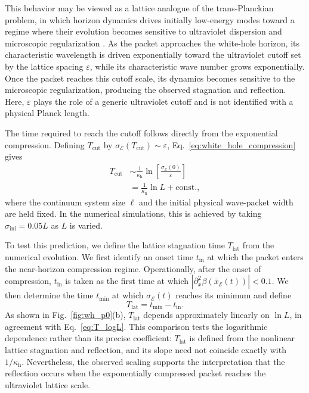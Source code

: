 \documentclass[reprint,amsmath,amssymb,aps,prb,showkeys,superscriptaddress]{revtex4-2}
\begin{document}
This behavior may be viewed as a lattice analogue of the
trans-Planckian problem, in which horizon dynamics drives initially
low-energy modes toward a regime where their evolution becomes
sensitive to ultraviolet dispersion and microscopic regularization
\cite{Jacobson1991,Jacobson1993,Unruh1995,
Corley1996,Akhmedov2024}. As the packet approaches the white-hole
horizon, its characteristic wavelength is driven exponentially
toward the ultraviolet cutoff set by the lattice spacing
$\varepsilon$, while its characteristic wave number grows
exponentially. Once the packet reaches this cutoff scale, its
dynamics becomes sensitive to the microscopic regularization,
producing the observed stagnation and reflection. Here,
$\varepsilon$ plays the role of a generic ultraviolet cutoff and is
not identified with a physical Planck length.

The time required to reach the cutoff follows directly from the
exponential compression. Defining $T_{\mathrm{cut}}$ by
$\sigma_{\mathcal E}(T_{\mathrm{cut}})\sim\varepsilon$,
Eq.~\eqref{eq:white_hole_compression} gives
\begin{align}
  T_{\mathrm{cut}}
  &\sim
  \frac{1}{\kappa_{\mathrm h}}
  \ln\left[
    \frac{\sigma_{\mathcal E}(0)}{\varepsilon}
  \right]
  \nonumber\\
  &=
  \frac{1}{\kappa_{\mathrm h}}\ln L
  +\mathrm{const.},
  \label{eq:T_logL}
\end{align}
where the continuum system size $\ell$ and the initial physical
wave-packet width are held fixed. In the numerical simulations,
this is achieved by taking
$\sigma_{\mathrm{ini}}=0.05L$ as $L$ is varied.

To test this prediction, we define the lattice stagnation time
$T_{\mathrm{lat}}$ from the numerical evolution. We first identify
an onset time $t_{\mathrm{in}}$ at which the packet enters the
near-horizon compression regime. Operationally, after the onset of
compression, $t_{\mathrm{in}}$ is taken as the first time at which
$|\partial_x^2\beta(\bar{x}_{\mathcal E}(t))|<0.1$. We then
determine the time $t_{\mathrm{min}}$ at which
$\sigma_{\mathcal E}(t)$ reaches its minimum and define
\begin{equation}
  T_{\mathrm{lat}}
  =
  t_{\mathrm{min}}-t_{\mathrm{in}}.
  \label{eq:lattice_stagnation_time}
\end{equation}
As shown in Fig.~\ref{fig:wh_p0}(b),
$T_{\mathrm{lat}}$ depends approximately linearly on $\ln L$, in
agreement with Eq.~\eqref{eq:T_logL}. This comparison tests the
logarithmic dependence rather than its precise coefficient:
$T_{\mathrm{lat}}$ is defined from the nonlinear lattice
stagnation and reflection, and its slope need not coincide exactly
with $1/\kappa_{\mathrm h}$. Nevertheless, the observed scaling
supports the interpretation that the reflection occurs when the
exponentially compressed packet reaches the ultraviolet lattice
scale.
\end{document}
